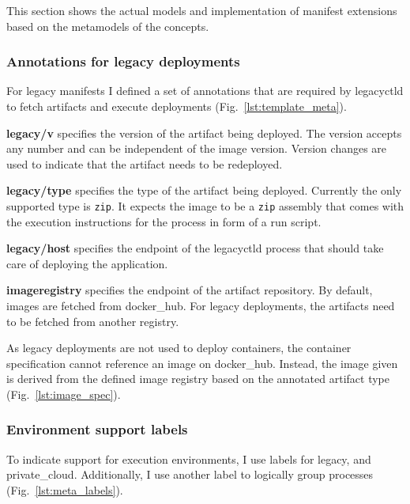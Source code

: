 \documentclass[../main.tex]{subfiles}
\begin{document}
    This section shows the actual models and implementation of manifest extensions based on the metamodels of the concepts.

    \subsubsection{Annotations for legacy deployments}

    For legacy manifests I defined a set of annotations that are required by \gls{legacyctld} to fetch artifacts and execute deployments (Fig.~\ref{lst:template_meta}).

    

    \textbf{legacy/v} specifies the version of the artifact being deployed.
    The version accepts any number and can be independent of the image version.
    Version changes are used to indicate that the artifact needs to be redeployed.

    \textbf{legacy/type} specifies the type of the artifact being deployed.
    Currently the only supported type is \verb|zip|.
    It expects the image to be a \verb|zip| assembly that comes with the execution instructions for the process in form of a run script.

    \textbf{legacy/host} specifies the endpoint of the \gls{legacyctld} process that should take care of deploying the application.

    \textbf{imageregistry} specifies the endpoint of the artifact repository.
    By default, images are fetched from \gls{docker_hub}.
    For legacy deployments, the artifacts need to be fetched from another registry.

    As legacy deployments are not used to deploy containers, the container specification cannot reference an image on \gls{docker_hub}.
    Instead, the image given is derived from the defined image registry based on the annotated artifact type (Fig.~\ref{lst:image_spec}).

    

    \subsubsection{Environment support labels}

    To indicate support for execution environments, I use labels for legacy,  and \gls{private_cloud}.
    Additionally, I use another label to logically group processes (Fig.~\ref{lst:meta_labels}).
\end{document}
